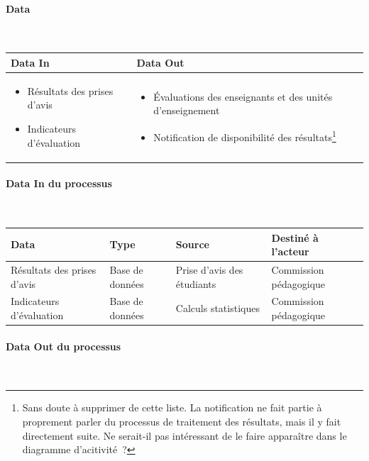 \documentclass[a4paper,11pt]{report}
\begin{document}
\paragraph{Data}~\newline{}

\begin{tabularx}{\linewidth}{|X|X|} \hline
Data In & Data Out \\ \hline
\begin{itemize}
	\item Résultats des prises d'avis
	\item Indicateurs d'évaluation\newline{}
\end{itemize}
 & 
\begin{itemize}
	\item Évaluations des enseignants et des unités d'enseignement
	\item Notification de disponibilité des résultats\footnote{Sans doute à supprimer de cette liste. La notification ne fait partie à proprement parler du processus de traitement des résultats, mais il y fait directement suite. Ne serait-il pas intéressant de le faire apparaître dans le diagramme d'acitivité~?}\newline{}
\end{itemize}
\\ \hline
\end{tabularx}

\paragraph{Data In du processus}~\newline{}

\begin{tabularx}{\linewidth}{|X|X|X|X|} \hline
Data & Type & Source & Destiné à l'acteur \\ \hline
Résultats des prises d'avis & Base de données & Prise d'avis des étudiants & Commission pédagogique \\
Indicateurs d'évaluation & Base de données & Calculs statistiques & Commission pédagogique \\ \hline
\end{tabularx}

\paragraph{Data Out du processus}~\newline{}
\end{document}
